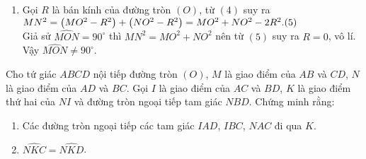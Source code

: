 \begin{bt}
{\begin{enumerate}
			$MN\cdot MK=MA\cdot MB=MC\cdot MD.\hfill (2)$\\
			$NM\cdot NK=NB\cdot NC=NA\cdot ND.\hfill (3)$\\
			Từ $(1)$, $(2)$, $(3)$ suy ra $MN^2=MC\cdot MD+NA\cdot ND.\hfill (4)$
			\item Gọi $R$ là bán kính của đường tròn $(O)$, từ $(4)$ suy ra \\
			$MN^2=\left(MO^2-R^2\right)+\left(NO^2-R^2\right)=MO^2+NO^2-2R^2.\hfill (5)$\\
			Giả sử $\widehat{MON}=90^\circ$ thì $MN^2=MO^2+NO^2$ nên từ $(5)$ suy ra $R=0$, vô lí.\\
			Vậy $\widehat{MON}\neq 90^\circ$.
		\end{enumerate}	
	}
\end{bt}
\begin{bt}
	Cho tứ giác $ABCD$ nội tiếp đường tròn $(O)$, $M$ là giao điểm của $AB$ và $CD$, $N$ là giao điểm của $AD$ và $BC$. Gọi $I$ là giao điểm của $AC$ và $BD$, $K$ là giao điểm thứ hai của $NI$ và đường tròn ngoại tiếp tam giác $NBD$. Chứng minh rằng: 
	\begin{enumerate}
		\item Các đường tròn ngoại tiếp các tam giác $IAD$, $IBC$, $NAC$ đi qua $K$.
		\item $\widehat{NKC}=\widehat{NKD}$.
	\end{enumerate}
\end{bt}
